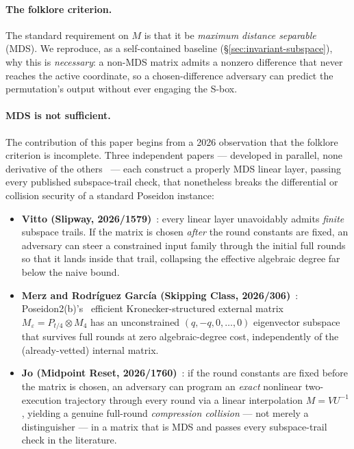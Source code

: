 \documentclass[11pt]{article}
\begin{document}
\paragraph{The folklore criterion.} The standard requirement on $M$ is
that it be \emph{maximum distance separable} (MDS). We reproduce, as a
self-contained baseline (\S\ref{sec:invariant-subspace}), why this is
\emph{necessary}: a non-MDS matrix admits a nonzero difference that never
reaches the active coordinate, so a chosen-difference adversary can
predict the permutation's output without ever engaging the S-box.

\paragraph{MDS is not sufficient.} The contribution of this paper begins
from a 2026 observation that the folklore criterion is incomplete. Three
independent papers --- developed in parallel, none derivative of the
others~\cite{vitto2026,merzgarcia2026,jo2026} --- each construct a
properly MDS linear layer, passing every published subspace-trail check,
that nonetheless breaks the differential or collision security of a
standard Poseidon instance:

\begin{itemize}[leftmargin=1.4em]
  \item \textbf{Vitto (Slipway, 2026/1579)}~\cite{vitto2026}: every linear
  layer unavoidably admits \emph{finite} subspace trails. If the matrix is
  chosen \emph{after} the round constants are fixed, an adversary can
  steer a constrained input family through the initial full rounds so
  that it lands inside that trail, collapsing the effective algebraic
  degree far below the naive bound.
  \item \textbf{Merz and Rodr\'iguez Garc\'ia (Skipping Class,
  2026/306)}~\cite{merzgarcia2026}: Poseidon2(b)'s~\cite{gks23} efficient
  Kronecker-structured external matrix $M_\varepsilon = P_{t/4}\otimes M_4$
  has an unconstrained $(q,-q,0,\dots,0)$ eigenvector subspace that
  survives full rounds at zero algebraic-degree cost, independently of the
  (already-vetted) internal matrix.
  \item \textbf{Jo (Midpoint Reset, 2026/1760)}~\cite{jo2026}: if the
  round constants are fixed before the matrix is chosen, an adversary can
  program an \emph{exact} nonlinear two-execution trajectory through every
  round via a linear interpolation $M = VU^{-1}$, yielding a genuine
  full-round \emph{compression collision} --- not merely a distinguisher
  --- in a matrix that is MDS and passes every subspace-trail check in the
  literature.
\end{itemize}
\end{document}
